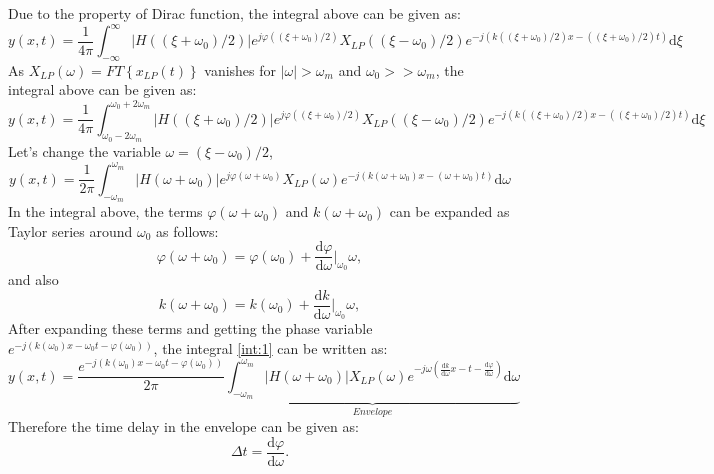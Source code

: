 \documentclass[11pt]{amsart}
\begin{document}
Due to the property of Dirac function, the integral above can be given as:
\begin{equation}
y(x,t)=\frac{1}{4 \pi} \int_{-\infty}^{\infty}\left | H((\xi+\omega_0)/2) \right | e^{j \varphi((\xi+\omega_0)/2) } X_{LP}((\xi-\omega_0)/2) e^{-j(k((\xi+\omega_0)/2)x - ((\xi+\omega_0)/2) t)} \mathrm{d} \xi
\end{equation}
As $X_{LP}(\omega)=FT\left \{  x_{LP}(t) \right \}$ vanishes for $\left | \omega \right | > \omega_m$ and $\omega_0 >> \omega_m$, the integral above can be given as:
\begin{equation}
y(x,t)=\frac{1}{4 \pi} \int_{\omega_0-2\omega_m}^{\omega_0+2\omega_m}\left | H((\xi+\omega_0)/2) \right | e^{j \varphi((\xi+\omega_0)/2) } X_{LP}((\xi-\omega_0)/2) e^{-j(k((\xi+\omega_0)/2)x - ((\xi+\omega_0)/2) t)} \mathrm{d} \xi
\end{equation}
Let's change the variable $\omega=(\xi-\omega_0)/2$,
\begin{equation}
\label{int:1}
y(x,t)=\frac{1}{2 \pi} \int_{-\omega_m}^{\omega_m}\left | H(\omega+\omega_0) \right | e^{j \varphi(\omega+\omega_0) } X_{LP}(\omega) e^{-j(k(\omega+\omega_0)x - (\omega+\omega_0) t)} \mathrm{d} \omega
\end{equation}
In the integral above, the terms $\varphi(\omega+\omega_0)$ and $k(\omega+\omega_0)$ can be expanded as Taylor series around $\omega_0$ as follows:
\begin{equation}
\varphi(\omega+\omega_0)=\varphi(\omega_0)+\frac{\mathrm{d}\varphi }{\mathrm{d} \omega}\Biggr|_{\omega_0} \omega,
\end{equation}
and also 
\begin{equation}
k(\omega+\omega_0)=k(\omega_0)+\frac{\mathrm{d}k }{\mathrm{d} \omega}\Biggr|_{\omega_0} \omega,
\end{equation}
After expanding these terms and getting the phase variable $e^{-j(k(\omega_0) x-\omega_0 t-\varphi(\omega_0))}$, the integral \ref{int:1} can be written as:
\begin{equation}
\label{int:1}
y(x,t)=\frac{e^{-j(k(\omega_0) x-\omega_0 t-\varphi(\omega_0))}}{2 \pi} \underbrace{\int_{-\omega_m}^{\omega_m}\left | H(\omega+\omega_0) \right | X_{LP}(\omega) e^{-j \omega(\frac{\mathrm{d}k }{\mathrm{d} \omega} x - t- \frac{\mathrm{d}\varphi }{\mathrm{d} \omega})} \mathrm{d} \omega}_{Envelope}
\end{equation}
Therefore the time delay in the envelope can be given as:
\begin{equation}
\Delta t = \frac{\mathrm{d}\varphi }{\mathrm{d} \omega}.
\end{equation}
\end{document}
